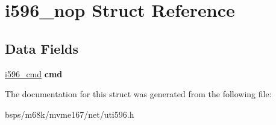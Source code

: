 \hypertarget{structi596__nop}{}\section{i596\+\_\+nop Struct Reference}
\label{structi596__nop}
\subsection*{Data Fields}
\begin{DoxyCompactItemize}
\item 
\mbox{\label{structi596__nop_a60bb3420a6614ad0270bf07a06c75a61}} 
\mbox{\hyperlink{structi596__cmd}{i596\+\_\+cmd}} {\bfseries cmd}
\end{DoxyCompactItemize}


The documentation for this struct was generated from the following file\+:\begin{DoxyCompactItemize}
\item 
bsps/m68k/mvme167/net/uti596.\+h\end{DoxyCompactItemize}

